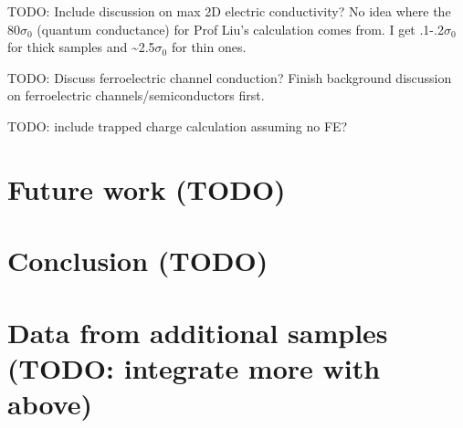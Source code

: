 TODO: Include discussion on max 2D electric conductivity? No idea
where the 80$\sigma_{0}$ (quantum conductance) for Prof Liu's calculation
comes from. I get .1-.2$\sigma_{0}$ for thick samples and \textasciitilde 2.5$\sigma_{0}$
for thin ones.

TODO: Discuss ferroelectric channel conduction? Finish background
discussion on ferroelectric channels/semiconductors first.

TODO: include trapped charge calculation assuming no FE?

\section{Future work (TODO)}

\section{Conclusion (TODO)}

\section{Data from additional samples (TODO: integrate more with above)}

